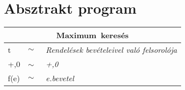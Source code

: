 \section{Absztrakt program}
\begin{center}
\begin{tabular}{|lll|}
	\hline
	\multicolumn{3}{|c|}{\textbf{Maximum~keresés}}\\
	\hline
	t & $\sim$ & \textit{Rendelések bevételeivel való felsorolója}\\
	+,0 & $\sim$~ & \textit{+,0}\\
	f(e) & $\sim$ & \textit{e.bevetel}\\
	\hline
\end{tabular}
\end{center}

